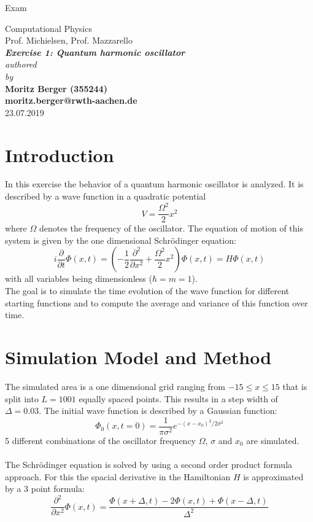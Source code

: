 \documentclass[12pt,a4paper]{article}
\author{Tim}
\begin{document}
	\setlength{\parindent}{0pt} 
	\begin{center}
		{\LARGE Exam}\\
		\begin{large}
			Computational Physics\\[0.4cm]
			Prof. Michielsen, Prof. Mazzarello\\[5.5cm]
			\Large\textbf{\textsl{Exercise 1: Quantum harmonic oscillator}}\\[5.5cm]
			\normalsize\textit{authored\\by}\\[0.4cm]
			\large\textbf{Moritz Berger (355244)\\moritz.berger@rwth-aachen.de}\\[2cm]
			\large{23.07.2019}
		\end{large}
	\end{center}
	\newpage
\section{Introduction}

In this exercise the behavior of a quantum harmonic oscillator is analyzed. It is described by a wave function in a quadratic potential
$$
V = \dfrac{\Omega^2}{2} x^2
$$
where $\Omega$ denotes the frequency of the oscillator. The equation of motion of this system is given by the one dimensional Schrödinger equation:
\begin{equation}
i \dfrac{\partial}{\partial t} \Phi(x,t) = \left(-\dfrac{1}{2}\dfrac{\partial^2}{\partial x^2} + \dfrac{\Omega^2}{2} x^2\right) \Phi(x,t) = H \Phi(x,t)
\end{equation}
with all variables being dimensionless ($\hbar = m = 1$).\\
The goal is to simulate the time evolution of the wave function for different starting functions and to compute the average and variance of this function over time.
\section{Simulation Model and Method}

The simulated area is a one dimensional grid ranging from $-15\leq x\leq 15$ that is split into $L=1001$ equally spaced points. This results in a step width of $\Delta = 0.03$. The initial wave function is described by a Gaussian function:
\begin{equation}
\Phi_0(x,t=0) = \dfrac{1}{\pi \sigma^2} e^{-(x-x_0)^2/2\sigma^2}
\end{equation}
5 different combinations of the oscillator frequency $\Omega$, $\sigma$ and $x_0$ are simulated. \\
\\
The Schrödinger equation is solved by using a second order product formula approach. For this the spacial derivative in the Hamiltonian $H$ is approximated by a 3 point formula:
\begin{equation}
\dfrac{\partial^2}{\partial x^2} \Phi(x,t) = \dfrac{\Phi(x+\Delta,t) - 2\Phi(x,t) + \Phi(x-\Delta,t)}{\Delta^2}
\end{equation}
\end{document}
